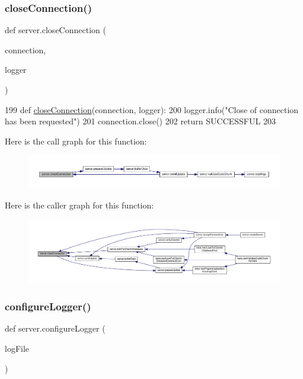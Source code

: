 \subsubsection{\texorpdfstring{close\+Connection()}{closeConnection()}}
{\footnotesize\ttfamily def server.\+close\+Connection (\begin{DoxyParamCaption}\item[{}]{connection,  }\item[{}]{logger }\end{DoxyParamCaption})}


\begin{DoxyCode}
199 \textcolor{keyword}{def }\hyperlink{namespaceserver_a2e99d18201fed087163454b021b7c007}{closeConnection}(connection, logger):
200      logger.info(\textcolor{stringliteral}{"Close of connection has been requested"})
201      connection.close()
202      \textcolor{keywordflow}{return} SUCCESSFUL
203 
\end{DoxyCode}
Here is the call graph for this function\+:
\nopagebreak
\begin{figure}[H]
\begin{center}
\leavevmode
\includegraphics[width=350pt]{namespaceserver_a2e99d18201fed087163454b021b7c007_cgraph}
\end{center}
\end{figure}
Here is the caller graph for this function\+:
\nopagebreak
\begin{figure}[H]
\begin{center}
\leavevmode
\includegraphics[width=350pt]{namespaceserver_a2e99d18201fed087163454b021b7c007_icgraph}
\end{center}
\end{figure}
\mbox{\label{namespaceserver_a44a7428717edc164d7dd564478da2da3}} 
\subsubsection{\texorpdfstring{configure\+Logger()}{configureLogger()}}
{\footnotesize\ttfamily def server.\+configure\+Logger (\begin{DoxyParamCaption}\item[{}]{log\+File }\end{DoxyParamCaption})}


